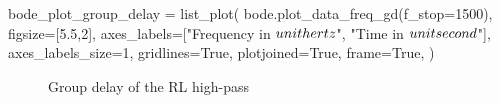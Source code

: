 \begin{sagesilent}
    bode_plot_group_delay = list_plot(
        bode.plot_data_freq_gd(f_stop=1500),
        figsize=[5.5,2],
        axes_labels=["Frequency in $\\unit{\\hertz}$", "Time in $\\unit{\\second}$"],
        axes_labels_size=1,
        gridlines=True,
        plotjoined=True,
        frame=True,
    )
\end{sagesilent}

\begin{figure}[H]
    \centering
    \caption{Group delay of the RL high-pass}
\end{figure}